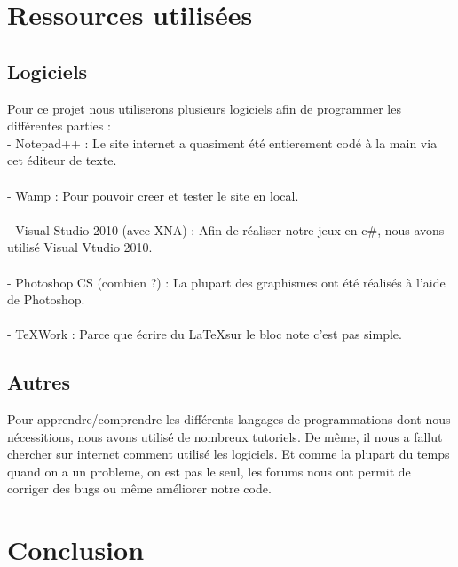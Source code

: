 \documentclass [11pt]{report}
\begin{document}
\chapter {Ressources utilisées}
	\section {Logiciels}

	Pour ce projet nous utiliserons plusieurs logiciels afin de programmer les différentes parties :\\

	- Notepad++ : Le site internet a quasiment été entierement codé à la main via cet éditeur de texte.\\\\\indent
	- Wamp : Pour pouvoir creer et tester le site en local.\\\\\indent
	- Visual Studio 2010 (avec XNA) : Afin de réaliser notre jeux en c\#, nous avons utilisé Visual Vtudio 2010.\\\\\indent
	- Photoshop CS (combien ?) : La plupart des graphismes ont été réalisés à l'aide de Photoshop.\\\\\indent
	- TeXWork : Parce que écrire du \LaTeX sur le bloc note c'est pas simple.\\\vspace{10mm}



	\section {Autres}

	Pour apprendre/comprendre les différents langages de programmations dont nous nécessitions, nous avons utilisé de nombreux tutoriels. De même, il nous a fallut chercher sur internet comment utilisé les logiciels. Et comme la plupart du temps quand on a un probleme, on est pas le seul, les forums nous ont permit de corriger des bugs ou même améliorer notre code.




\chapter {Conclusion}
\end{document}
